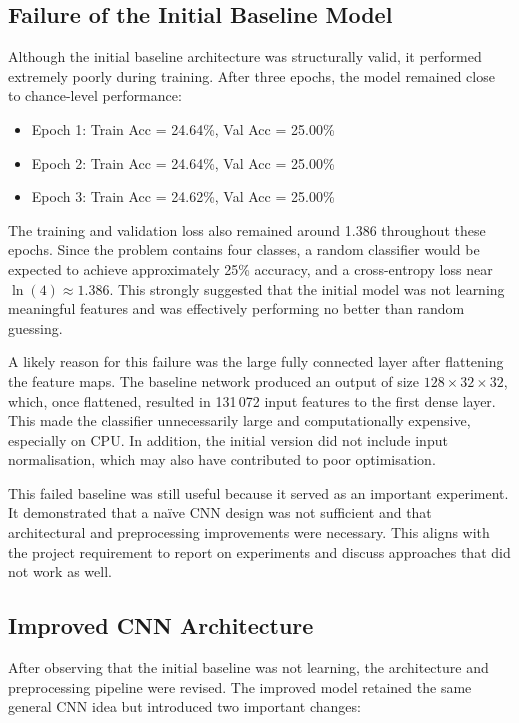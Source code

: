 \documentclass{article}
\begin{document}
\subsection{Failure of the Initial Baseline Model}

Although the initial baseline architecture was structurally valid, it performed extremely poorly during training. After three epochs, the model remained close to chance-level performance:

\begin{itemize}
    \item Epoch 1: Train Acc = 24.64\%, Val Acc = 25.00\%
    \item Epoch 2: Train Acc = 24.64\%, Val Acc = 25.00\%
    \item Epoch 3: Train Acc = 24.62\%, Val Acc = 25.00\%
\end{itemize}

The training and validation loss also remained around 1.386 throughout these epochs. Since the problem contains four classes, a random classifier would be expected to achieve approximately 25\% accuracy, and a cross-entropy loss near $\ln(4) \approx 1.386$. This strongly suggested that the initial model was not learning meaningful features and was effectively performing no better than random guessing.

A likely reason for this failure was the large fully connected layer after flattening the feature maps. The baseline network produced an output of size $128 \times 32 \times 32$, which, once flattened, resulted in 131\,072 input features to the first dense layer. This made the classifier unnecessarily large and computationally expensive, especially on CPU. In addition, the initial version did not include input normalisation, which may also have contributed to poor optimisation.

This failed baseline was still useful because it served as an important experiment. It demonstrated that a naïve CNN design was not sufficient and that architectural and preprocessing improvements were necessary. This aligns with the project requirement to report on experiments and discuss approaches that did not work as well.

\subsection{Improved CNN Architecture}

After observing that the initial baseline was not learning, the architecture and preprocessing pipeline were revised. The improved model retained the same general CNN idea but introduced two important changes:
\end{document}
